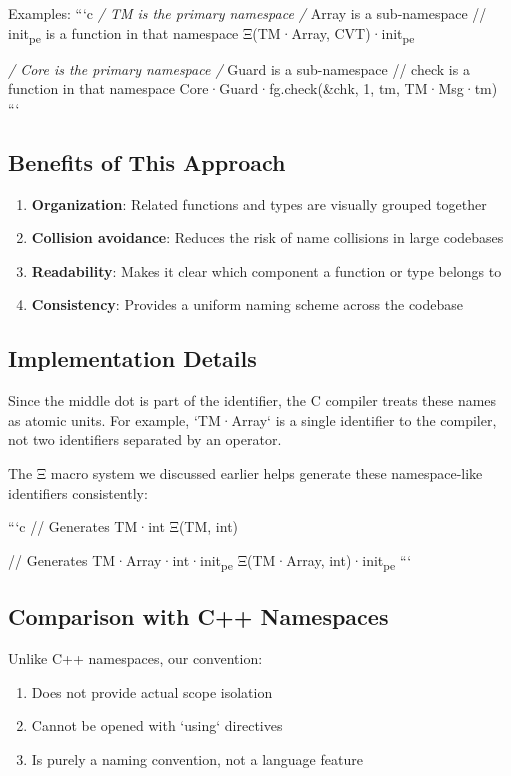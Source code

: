 \documentclass[11pt]{article}
\begin{document}
Examples:
```c
\emph{/ TM is the primary namespace
/} Array is a sub-namespace
// init\textsubscript{pe} is a function in that namespace
Ξ(TM·Array, CVT)·init\textsubscript{pe}

\emph{/ Core is the primary namespace
/} Guard is a sub-namespace
// check is a function in that namespace
Core·Guard·fg.check(\&chk, 1, tm, TM·Msg·tm)
```

\subsection{Benefits of This Approach}
\label{sec:orgc15284c}

\begin{enumerate}
\item \textbf{\textbf{Organization}}: Related functions and types are visually grouped together
\item \textbf{\textbf{Collision avoidance}}: Reduces the risk of name collisions in large codebases
\item \textbf{\textbf{Readability}}: Makes it clear which component a function or type belongs to
\item \textbf{\textbf{Consistency}}: Provides a uniform naming scheme across the codebase
\end{enumerate}

\subsection{Implementation Details}
\label{sec:org4c7d92c}

Since the middle dot is part of the identifier, the C compiler treats these names as atomic units. For example, `TM·Array` is a single identifier to the compiler, not two identifiers separated by an operator.

The Ξ macro system we discussed earlier helps generate these namespace-like identifiers consistently:

```c
// Generates TM·int
Ξ(TM, int)

// Generates TM·Array·int·init\textsubscript{pe}
Ξ(TM·Array, int)·init\textsubscript{pe}
```

\subsection{Comparison with C++ Namespaces}
\label{sec:org420b759}

Unlike C++ namespaces, our convention:
\begin{enumerate}
\item Does not provide actual scope isolation
\item Cannot be opened with `using` directives
\item Is purely a naming convention, not a language feature
\end{enumerate}
\end{document}
